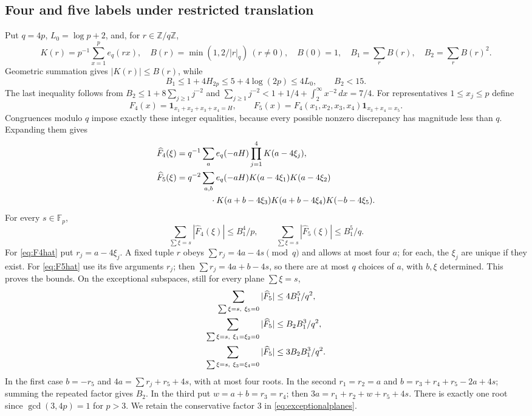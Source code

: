 \documentclass[10pt]{amsart}
\theoremstyle{remark}
\newcommand{\Fp}{\mathbb F_p}
\newcommand{\ind}{\mathbf 1}
\begin{document}
\subsection{Four and five labels under restricted translation}
Put $q=4p$, $L_0=\log p+2$, and, for $r\in\mathbb Z/q\mathbb Z$,
\[
 K(r)=p^{-1}\sum_{x=1}^p e_q(rx),\quad
 B(r)=\min(1,2/|r|_q)\ (r\ne0),\quad B(0)=1,
 \quad B_1=\sum_rB(r),\quad B_2=\sum_rB(r)^2.
\]
Geometric summation gives $|K(r)|\le B(r)$, while
\begin{equation}\label{eq:Bbounds}
 B_1\le1+4H_{2p}\le5+4\log(2p)\le4L_0,
 \qquad B_2<15.
\end{equation}
The last inequality follows from
$B_2\le1+8\sum_{j\ge1}j^{-2}$ and
$\sum_{j\ge1}j^{-2}<1+1/4+\int_2^\infty x^{-2}\,dx=7/4$.
For representatives $1\le x_j\le p$ define
\[
 F_4(x)=\ind_{x_1+x_2+x_3+x_4=H},\qquad
 F_5(x)=F_4(x_1,x_2,x_3,x_4)\ind_{x_3+x_4=x_5}.
\]
Congruences modulo $q$ impose exactly these integer equalities,
because every possible nonzero discrepancy has magnitude less than
$q$. Expanding them gives
\begin{align}
 \widehat F_4(\xi)&=q^{-1}\sum_a e_q(-aH)
 \prod_{j=1}^4K(a-4\xi_j),\label{eq:F4hat}\\
 \widehat F_5(\xi)&=q^{-2}\sum_{a,b}e_q(-aH)
 K(a-4\xi_1)K(a-4\xi_2)\notag\\
 &\hspace{14mm}\cdot K(a+b-4\xi_3)K(a+b-4\xi_4)K(-b-4\xi_5).
 \label{eq:F5hat}
\end{align}
For every $s\in\Fp$,
\begin{equation}\label{eq:planes}
 \sum_{\sum\xi=s}|\widehat F_4(\xi)|\le B_1^4/p,
 \qquad
 \sum_{\sum\xi=s}|\widehat F_5(\xi)|\le B_1^5/q.
\end{equation}
For \eqref{eq:F4hat} put $r_j=a-4\xi_j$. A fixed tuple $r$ obeys
$\sum r_j=4a-4s\pmod q$ and allows at most four $a$; for each,
the $\xi_j$ are unique if they exist. For \eqref{eq:F5hat} use its
five arguments $r_j$; then $\sum r_j=4a+b-4s$, so there are at most
$q$ choices of $a$, with $b,\xi$ determined. This proves the bounds.
On the exceptional subspaces, still for every plane $\sum\xi=s$,
\begin{align}
 \sum_{\sum\xi=s,\ \xi_5=0}|\widehat F_5|&\le4B_1^5/q^2,
 \notag\\
 \sum_{\sum\xi=s,\ \xi_1=\xi_2=0}|\widehat F_5|&\le B_2B_1^3/q^2,
 \label{eq:exceptionalplanes}\\
 \sum_{\sum\xi=s,\ \xi_3=\xi_4=0}|\widehat F_5|&\le3B_2B_1^3/q^2.
 \notag
\end{align}
In the first case $b=-r_5$ and $4a=\sum r_j+r_5+4s$, with at most
four roots. In the second $r_1=r_2=a$ and
$b=r_3+r_4+r_5-2a+4s$; summing the repeated factor gives $B_2$.
In the third put $w=a+b=r_3=r_4$; then
$3a=r_1+r_2+w+r_5+4s$. There is exactly one root since
$\gcd(3,4p)=1$ for $p>3$. We retain the conservative factor $3$
in \eqref{eq:exceptionalplanes}.
\end{document}
